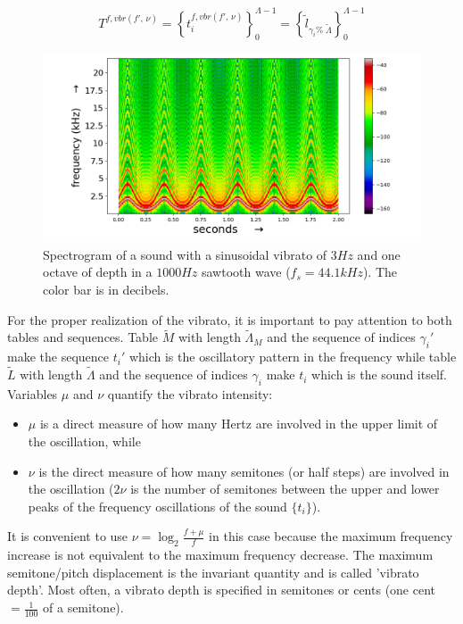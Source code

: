 \begin{equation}\label{vbrT}
 T^{f, vbr(f',\,\nu)}=\left\{ t_i^{f,vbr(f',\,\nu)} \right\}_0^{\Lambda-1}=\left\{ \widetilde{l}_{\gamma_i \%\; \widetilde{\Lambda} } \right\}_0^{\Lambda-1}
\end{equation}

\begin{figure}[h!]
     \centering
         \includegraphics[width=\columnwidth]{figures/vibrato_}
     \caption{Spectrogram of a sound with a sinusoidal vibrato of $3Hz$ and one octave of depth in a $1000Hz$ sawtooth wave ($f_s=44.1kHz$). The color bar is in decibels.}
         \label{fig:vibrato}
\end{figure}

For the proper realization of the vibrato, it is important to pay attention to both tables and sequences. Table $\widetilde{M}$ with length $\widetilde{\Lambda}_M$ and the sequence of indices $\gamma_i'$ make the sequence $t_i'$ which is the oscillatory pattern in the frequency while table $\widetilde{L}$ with length $\widetilde{\Lambda}$ and the sequence of indices $\gamma_i$ make $t_i$ which is the sound itself. Variables $\mu$ and $\nu$ quantify the vibrato intensity:
\begin{itemize}
    \item $\mu$ is a direct measure of how many Hertz are involved in the upper limit of the oscillation, while
    \item $\nu$ is the direct measure of how many semitones (or half steps) are involved in the oscillation ($2\nu$ is the number of semitones between the upper and lower peaks of the frequency oscillations of the sound $\{t_i\}$).
\end{itemize}

It is convenient to use $\nu=\log_{2}\frac{f+\mu}{f} $ in this case because the maximum frequency increase is not equivalent to the maximum frequency decrease.
The maximum semitone/pitch displacement is the invariant quantity
and is called 'vibrato depth'.
Most often, a vibrato depth is specified in semitones or cents (one cent $= \frac{1}{100}$ of a semitone).

